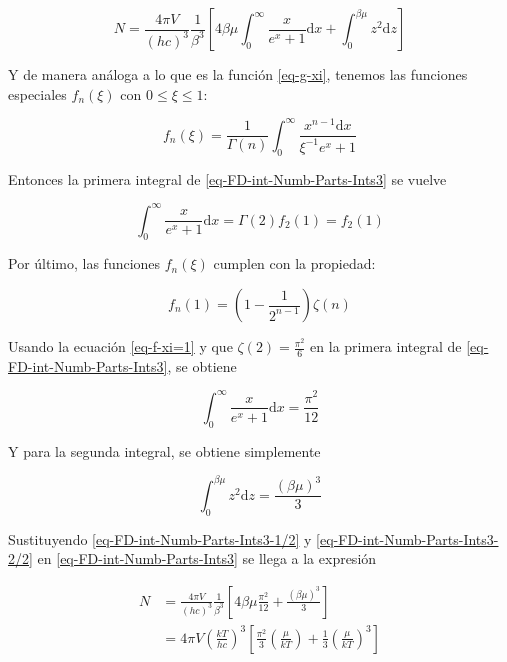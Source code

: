 \begin{equation}\label{eq-FD-int-Numb-Parts-Ints3}
N = \frac{4 \pi V}{(hc)^{3}} \frac{1}{{\beta}^{3}} \left[4\beta \mu \int_{0}^{\infty} \frac{x}{{e}^{x} + 1} \mathrm{d} x + \int_{0}^{\beta \mu} {z}^{2} \mathrm{d}z \right]
\end{equation}

Y de manera análoga a lo que es la función \eqref{eq-g-xi}, tenemos las funciones especiales ${f}_{n}(\xi)$ con $0 \leq \xi \leq 1$:

\begin{equation}\label{eq-f-xi}
{f}_{n}(\xi) = \frac{1}{\Gamma(n)} \int_{0}^{\infty} \frac{{x}^{n-1} \mathrm{d}x}{{\xi}^{-1}{e}^{x} + 1}
\end{equation}

Entonces la primera integral de \eqref{eq-FD-int-Numb-Parts-Ints3} se vuelve

\begin{equation}
\int_{0}^{\infty} \frac{x}{{e}^{x} + 1} \mathrm{d} x = \Gamma(2) {f}_{2}(1) = {f}_{2}(1)
\end{equation}

Por último, las funciones ${f}_{n}(\xi)$ cumplen con la propiedad:

\begin{equation}\label{eq-f-xi=1}
{f}_{n}(1) = \left(1 - \frac{1}{{2}^{n-1}} \right) \zeta (n)
\end{equation}

Usando la ecuación \eqref{eq-f-xi=1} y que $\zeta(2)= \displaystyle \frac{{\pi}^{2}}{6}$ en la primera integral de \eqref{eq-FD-int-Numb-Parts-Ints3}, se obtiene

\begin{equation}\label{eq-FD-int-Numb-Parts-Ints3-1/2}
\int_{0}^{\infty} \frac{x}{{e}^{x} + 1} \mathrm{d} x = \frac{{\pi}^{2}}{12}
\end{equation}

Y para la segunda integral, se obtiene simplemente

\begin{equation}\label{eq-FD-int-Numb-Parts-Ints3-2/2}
\int_{0}^{\beta \mu} {z}^{2} \mathrm{d}z = \frac{(\beta \mu)^{3}}{3}
\end{equation}

Sustituyendo \eqref{eq-FD-int-Numb-Parts-Ints3-1/2} y \eqref{eq-FD-int-Numb-Parts-Ints3-2/2} en \eqref{eq-FD-int-Numb-Parts-Ints3} se llega a la expresión

\begin{equation}
\begin{split}
N & = \frac{4 \pi V}{(hc)^{3}} \frac{1}{{\beta}^{3}} \left[4 \beta \mu \frac{{\pi}^{2}}{12} + \frac{(\beta \mu)^{3}}{3} \right] \\
& = 4 \pi V \left(\frac{kT}{hc} \right)^{3} \left[ \frac{{\pi}^{2}}{3} \left(\frac{\mu}{kT}\right) + \frac{1}{3} \left(\frac{\mu}{kT} \right)^{3} \right]
\end{split}
\end{equation}

